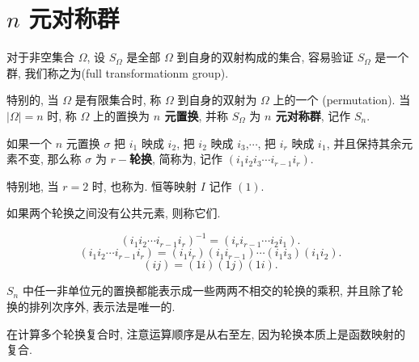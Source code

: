 \section{$n$ 元对称群}

\begin{definition}
	对于非空集合 $\Omega$, 设 $S_\Omega$ 是全部 $\Omega$ 到自身的双射构成的集合, 容易验证 $S_\Omega$ 是一个群, 我们称之为(full transformationm group).

	特别的, 当 $\Omega$ 是有限集合时, 称 $\Omega$ 到自身的双射为 $\Omega$ 上的一个 (permutation). 当 $|\Omega|=n$ 时, 称 $\Omega$ 上的置换为 \textbf{$n$ 元置换}, 并称 $S_\Omega$ 为 \textbf{$n$ 元对称群}, 记作 $S_n$.
\end{definition}

\begin{definition}
	如果一个 $n$ 元置换 $\sigma$ 把 $i_1$ 映成 $i_2$, 把 $i_2$ 映成 $i_3$,$\cdots$, 把 $i_{r}$ 映成 $i_1$, 并且保持其余元素不变, 那么称 $\sigma$ 为 $r-$\textbf{轮换}, 简称为, 记作 $(i_1i_2i_3\cdots i_{r-1}i_r)$.

	特别地, 当 $r=2$ 时, 也称为. 恒等映射 $I$ 记作 $(1)$.

	如果两个轮换之间没有公共元素, 则称它们.
\end{definition}

\begin{property}
	\begin{equation}
		(i_1i_2\cdots i_{r-1} i_r)^{-1}=(i_ri_{r-1}\cdots i_2i_1).
	\end{equation}
	\begin{equation}
		(i_1i_2\cdots i_{r-1}i_r)=(i_1i_r)(i_1i_{r-1})\cdots(i_1i_3)(i_1i_2).
	\end{equation}
	\begin{equation}\label{eq:对称群:3}
		(ij)=(1i)(1j)(1i).
	\end{equation}
\end{property}

\begin{theorem}
	 $S_n$ 中任一非单位元的置换都能表示成一些两两不相交的轮换的乘积, 并且除了轮换的排列次序外, 表示法是唯一的.
\end{theorem}

\begin{remark*}
	在计算多个轮换复合时, 注意运算顺序是从右至左,  因为轮换本质上是函数映射的复合.
\end{remark*}



